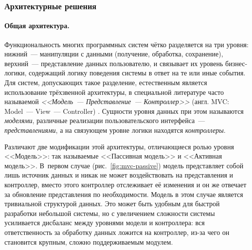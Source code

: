\documentclass[a4paper, 14pt, titlepage]{extarticle}
\newcommand{\eng}[1]{\foreignlanguage{english}{#1}}
\newcommand{\term}[1]{\emph{#1}}
\begin{document}
  \subsubsection{Архитектурные решения}

  \paragraph{Общая архитектура.}
  Функциональность многих программных систем чётко разделяется на три уровня: нижний~---
  манипуляции с данными (получение, обработка, сохранение), верхний~--- представление данных
  пользователю, и связывает их уровень бизнес-логики, содержащий логику поведения системы в ответ
  на те или иные события. Для систем, допускающих такое разделение, естественным является
  использование трёхзвенной архитектуры, в специальной литературе часто называемой
  \term{<<Модель~--- Представление~--- Контроллер>>} (англ. \eng{MVC: Model~--- View~--- Controller})
  \cite{gamma-patterns}. Сущности уровня данных при этом называются \term{моделями}, различные
  реализации пользовательского интерфейса~--- \term{представлениями}, а на связующем уровне логики
  находятся \term{контроллеры}.

  Различают две модификации этой архитектуры, отличающиеся ролью уровня <<Модель>>: так называемые
  <<Пассивная модель>> и <<Активная модель>>. В~первом случае (рис.~\ref{fig:mvc-passive}) модель
  представляет собой лишь источник данных и никак не может воздействовать на представления и
  контроллер, вместо этого контроллер отслеживает её изменения и он же отвечает за обновление
  представления по необходимости. Модель в этом случае является тривиальной структурой данных. Это
  может быть удобным для быстрой разработки небольшой системы, но с увеличением сложности системы
  усиливается дисбаланс между уровнями модели и контроллера: вся ответственность за обработку данных
  ложится на контроллер, из-за чего он становится крупным, сложно поддерживаемым модулем.
\end{document}
